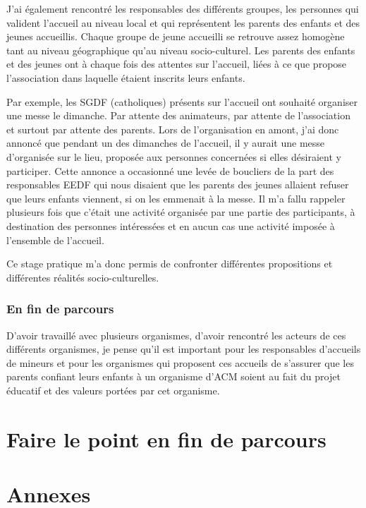 \documentclass[titlepage,11pt,a4paper]{article}
\begin{document}
J'ai également rencontré les responsables des différents groupes, les personnes qui
valident l'accueil au niveau local et qui représentent les parents des enfants et des
jeunes accueillis. Chaque groupe de jeune accueilli se retrouve assez homogène tant au niveau
géographique qu'au niveau socio-culturel. Les parents des enfants et des jeunes ont à
chaque fois des attentes sur l'accueil, liées à ce que propose l'association dans laquelle
étaient inscrits leurs enfants.

Par exemple, les SGDF (catholiques) présents sur l'accueil ont souhaité organiser une
messe le dimanche. Par attente des animateurs, par attente de l'association et surtout
par attente des parents. Lors de l'organisation en amont, j'ai donc annoncé que pendant
un des dimanches de l'accueil, il y aurait une messe d'organisée sur le lieu, proposée aux personnes
concernées si elles désiraient y participer. Cette annonce a occasionné une levée de
boucliers de la part des responsables EEDF qui nous disaient que les parents des jeunes
allaient refuser que leurs enfants viennent, si on les emmenait à la messe. Il m'a fallu
rappeler plusieurs fois que c'était une activité organisée par une partie des
participants, à destination des personnes intéressées et en aucun cas une activité imposée
à l'ensemble de l'accueil.

Ce stage pratique m'a donc permis de confronter différentes propositions et différentes
réalités socio-culturelles.

\subsubsection{En fin de parcours}

D'avoir travaillé avec plusieurs organismes, d'avoir rencontré les acteurs de ces
différents organismes, je pense qu'il est important pour les responsables d'accueils de
mineurs et pour les organismes qui proposent ces accueils de s'assurer que les parents
confiant leurs enfants à un organisme d'ACM soient au fait du projet éducatif et des
valeurs portées par cet organisme.

\section{Faire le point en fin de parcours}




\section{Annexes}
\end{document}
